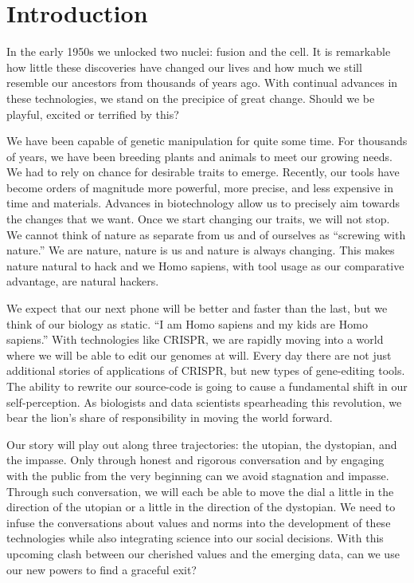 \section{Introduction}
\label{sec:introduction}

In the early 1950s we unlocked two nuclei: fusion and the cell.
It is remarkable how little these discoveries have changed our lives and how much we still resemble our ancestors from thousands of years ago.
With continual advances in these technologies, we stand on the precipice of great change.
Should we be playful, excited or terrified by this?

We have been capable of genetic manipulation for quite some time.
For thousands of years, we have been breeding plants and animals to meet our growing needs.
We had to rely on chance for desirable traits to emerge.
Recently, our tools have become orders of magnitude more powerful, more precise, and less expensive in time and materials.
Advances in biotechnology allow us to precisely aim towards the changes that we want.
Once we start changing our traits, we will not stop.
We cannot think of nature as separate from us and of ourselves as ``screwing with nature.''
We are nature, nature is us and nature is always changing.
This makes nature natural to hack and we Homo sapiens, with tool usage as our comparative advantage, are natural hackers.

We expect that our next phone will be better and faster than the last, but we think of our biology as static.
``I am Homo sapiens and my kids are Homo sapiens.''
With technologies like CRISPR, we are rapidly moving into a world where we will be able to edit our genomes at will.
Every day there are not just additional stories of applications of CRISPR, but new types of gene-editing tools.
The ability to rewrite our source-code is going to cause a fundamental shift in our self-perception.
As biologists and data scientists spearheading this revolution, we bear the lion's share of responsibility in moving the world forward.

Our story will play out along three trajectories: the utopian, the dystopian, and the impasse.
Only through honest and rigorous conversation and by engaging with the public from the very beginning can we avoid stagnation and impasse.
Through such conversation, we will each be able to move the dial a little in the direction of the utopian or a little in the direction of the dystopian.
We need to infuse the conversations about values and norms into the development of these technologies while also integrating science into our social decisions.
With this upcoming clash between our cherished values and the emerging data, can we use our new powers to find a graceful exit?
